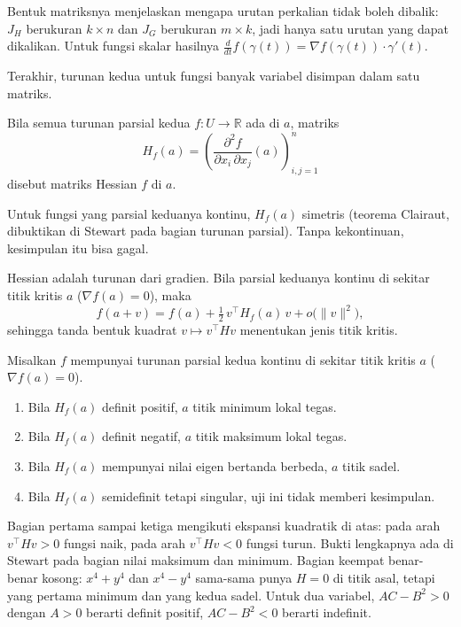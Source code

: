 Bentuk matriksnya menjelaskan mengapa urutan perkalian tidak boleh dibalik: $J_{H}$
berukuran $k\times n$ dan $J_{G}$ berukuran $m\times k$, jadi hanya satu urutan yang dapat
dikalikan. Untuk fungsi skalar hasilnya $\frac{d}{dt}f(\gamma(t))=\nabla f(\gamma(t))\cdot
\gamma'(t)$.

Terakhir, turunan kedua untuk fungsi banyak variabel disimpan dalam satu matriks.


\begin{definisi}
Bila semua turunan parsial kedua $f\colon U\to\mathbb{R}$ ada di $a$, matriks
\[
  H_{f}(a)=\left(\frac{\partial^{2}f}{\partial x_{i}\,\partial x_{j}}(a)\right)_{i,j=1}^{n}
\]
disebut matriks Hessian $f$ di $a$.
\end{definisi}

Untuk fungsi yang parsial keduanya kontinu, $H_{f}(a)$ simetris (teorema Clairaut, dibuktikan
di Stewart pada bagian turunan parsial). Tanpa kekontinuan, kesimpulan itu bisa gagal.

Hessian adalah turunan dari gradien. Bila parsial keduanya kontinu di sekitar titik kritis
$a$ ($\nabla f(a)=0$), maka
\[
  f(a+v)=f(a)+\tfrac12\,v^{\top}H_{f}(a)\,v+o\bigl(\|v\|^{2}\bigr),
\]
sehingga tanda bentuk kuadrat $v\mapsto v^{\top}Hv$ menentukan jenis titik kritis.

\begin{proposisi}
Misalkan $f$ mempunyai turunan parsial kedua kontinu di sekitar titik kritis $a$
($\nabla f(a)=0$).
\begin{enumerate}
  \item Bila $H_{f}(a)$ definit positif, $a$ titik minimum lokal tegas.
  \item Bila $H_{f}(a)$ definit negatif, $a$ titik maksimum lokal tegas.
  \item Bila $H_{f}(a)$ mempunyai nilai eigen bertanda berbeda, $a$ titik sadel.
  \item Bila $H_{f}(a)$ semidefinit tetapi singular, uji ini tidak memberi kesimpulan.
\end{enumerate}
\end{proposisi}

Bagian pertama sampai ketiga mengikuti ekspansi kuadratik di atas: pada arah $v^{\top}Hv>0$
fungsi naik, pada arah $v^{\top}Hv<0$ fungsi turun. Bukti lengkapnya ada di Stewart pada
bagian nilai maksimum dan minimum. Bagian keempat benar-benar kosong: $x^{4}+y^{4}$ dan
$x^{4}-y^{4}$ sama-sama punya $H=0$ di titik asal, tetapi yang pertama minimum dan yang kedua
sadel. Untuk dua variabel, $AC-B^{2}>0$ dengan $A>0$ berarti definit positif, $AC-B^{2}<0$
berarti indefinit.

